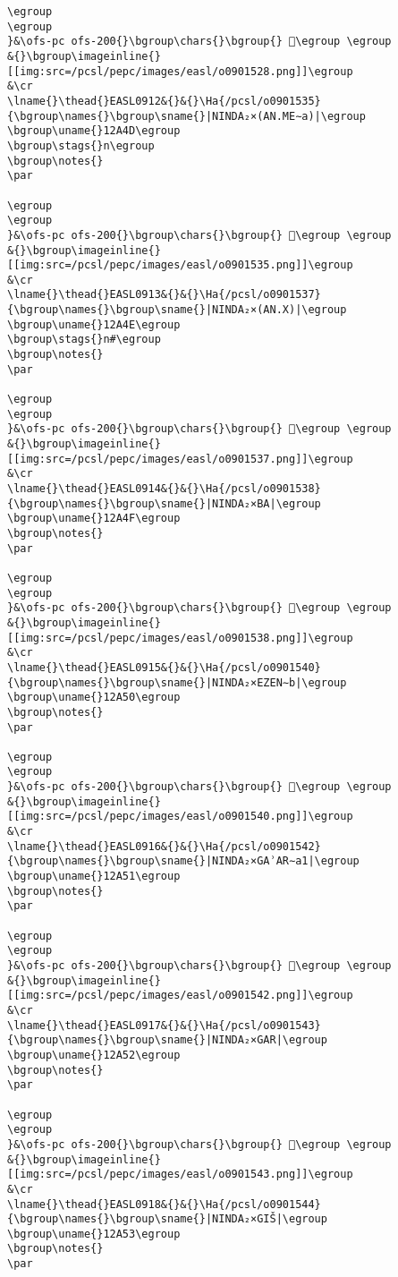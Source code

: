 \begin{verbatim}
\egroup
\egroup
}&\ofs-pc ofs-200{}\bgroup\chars{}\bgroup{} 𒩌\egroup \egroup
&{}\bgroup\imageinline{}[[img:src=/pcsl/pepc/images/easl/o0901528.png]]\egroup
&\cr
\lname{}\thead{}EASL0912&{}&{}\Ha{/pcsl/o0901535}{\bgroup\names{}\bgroup\sname{}|NINDA₂×(AN.ME∼a)|\egroup
\bgroup\uname{}12A4D\egroup
\bgroup\stags{}n\egroup
\bgroup\notes{}
\par 

\egroup
\egroup
}&\ofs-pc ofs-200{}\bgroup\chars{}\bgroup{} 𒩍\egroup \egroup
&{}\bgroup\imageinline{}[[img:src=/pcsl/pepc/images/easl/o0901535.png]]\egroup
&\cr
\lname{}\thead{}EASL0913&{}&{}\Ha{/pcsl/o0901537}{\bgroup\names{}\bgroup\sname{}|NINDA₂×(AN.X)|\egroup
\bgroup\uname{}12A4E\egroup
\bgroup\stags{}n#\egroup
\bgroup\notes{}
\par 

\egroup
\egroup
}&\ofs-pc ofs-200{}\bgroup\chars{}\bgroup{} 𒩎\egroup \egroup
&{}\bgroup\imageinline{}[[img:src=/pcsl/pepc/images/easl/o0901537.png]]\egroup
&\cr
\lname{}\thead{}EASL0914&{}&{}\Ha{/pcsl/o0901538}{\bgroup\names{}\bgroup\sname{}|NINDA₂×BA|\egroup
\bgroup\uname{}12A4F\egroup
\bgroup\notes{}
\par 

\egroup
\egroup
}&\ofs-pc ofs-200{}\bgroup\chars{}\bgroup{} 𒩏\egroup \egroup
&{}\bgroup\imageinline{}[[img:src=/pcsl/pepc/images/easl/o0901538.png]]\egroup
&\cr
\lname{}\thead{}EASL0915&{}&{}\Ha{/pcsl/o0901540}{\bgroup\names{}\bgroup\sname{}|NINDA₂×EZEN∼b|\egroup
\bgroup\uname{}12A50\egroup
\bgroup\notes{}
\par 

\egroup
\egroup
}&\ofs-pc ofs-200{}\bgroup\chars{}\bgroup{} 𒩐\egroup \egroup
&{}\bgroup\imageinline{}[[img:src=/pcsl/pepc/images/easl/o0901540.png]]\egroup
&\cr
\lname{}\thead{}EASL0916&{}&{}\Ha{/pcsl/o0901542}{\bgroup\names{}\bgroup\sname{}|NINDA₂×GAʾAR∼a1|\egroup
\bgroup\uname{}12A51\egroup
\bgroup\notes{}
\par 

\egroup
\egroup
}&\ofs-pc ofs-200{}\bgroup\chars{}\bgroup{} 𒩑\egroup \egroup
&{}\bgroup\imageinline{}[[img:src=/pcsl/pepc/images/easl/o0901542.png]]\egroup
&\cr
\lname{}\thead{}EASL0917&{}&{}\Ha{/pcsl/o0901543}{\bgroup\names{}\bgroup\sname{}|NINDA₂×GAR|\egroup
\bgroup\uname{}12A52\egroup
\bgroup\notes{}
\par 

\egroup
\egroup
}&\ofs-pc ofs-200{}\bgroup\chars{}\bgroup{} 𒩒\egroup \egroup
&{}\bgroup\imageinline{}[[img:src=/pcsl/pepc/images/easl/o0901543.png]]\egroup
&\cr
\lname{}\thead{}EASL0918&{}&{}\Ha{/pcsl/o0901544}{\bgroup\names{}\bgroup\sname{}|NINDA₂×GIŠ|\egroup
\bgroup\uname{}12A53\egroup
\bgroup\notes{}
\par 


\end{verbatim}
